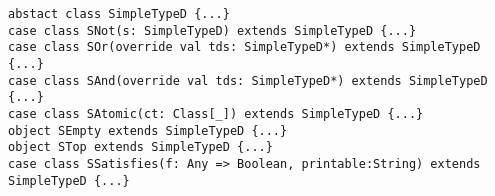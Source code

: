 
\begin{lstlisting}[style=scalaioScala]
abstact class SimpleTypeD {...}
case class SNot(s: SimpleTypeD) extends SimpleTypeD {...}
case class SOr(override val tds: SimpleTypeD*) extends SimpleTypeD {...}
case class SAnd(override val tds: SimpleTypeD*) extends SimpleTypeD {...}
case class SAtomic(ct: Class[_]) extends SimpleTypeD {...}
object SEmpty extends SimpleTypeD {...}
object STop extends SimpleTypeD {...}
case class SSatisfies(f: Any => Boolean, printable:String) extends SimpleTypeD {...}
\end{lstlisting}
